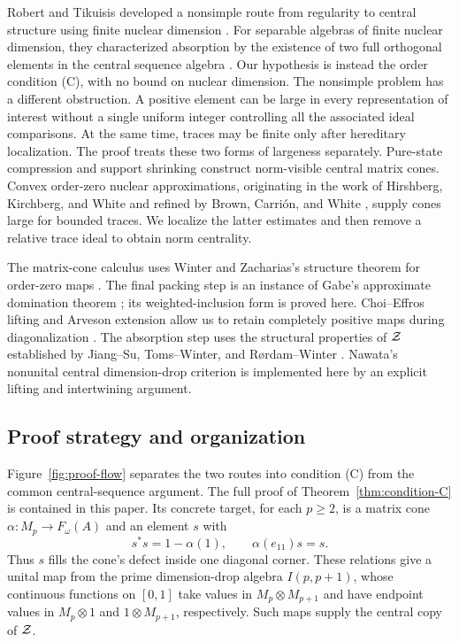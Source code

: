 Robert and Tikuisis developed a nonsimple route from regularity to
central structure using finite nuclear dimension
\cite[Theorem~1.1]{RobertTikuisis2017}. For separable algebras of
finite nuclear dimension, they characterized absorption by the
existence of two full orthogonal elements in the central sequence
algebra \cite[Theorem~1.2]{RobertTikuisis2017}.
Our hypothesis is instead the order condition \textup{(C)}, with no
bound on nuclear dimension.
The nonsimple problem has a different obstruction. A positive element
can be large in every representation of interest without a single
uniform integer controlling all the associated ideal comparisons.
At the same time, traces may be finite only after hereditary
localization. The proof treats these two forms of largeness
separately. Pure-state compression and support shrinking construct
norm-visible central matrix cones. Convex order-zero nuclear
approximations, originating in the work of Hirshberg, Kirchberg,
and White \cite{HKW2012} and refined by Brown, Carri\'on,
and White \cite{BCW2019}, supply cones large for bounded traces.
We localize the latter estimates and then remove a relative trace
ideal to obtain norm centrality.

The matrix-cone calculus uses Winter and Zacharias's structure
theorem for order-zero maps \cite{WZ2009}. The final packing step is
an instance of Gabe's approximate domination theorem
\cite{Gabe2020}; its weighted-inclusion form is proved here.
Choi--Effros lifting and Arveson extension allow us to retain
completely positive maps during diagonalization
\cite{CE1976,Arveson1969}. The absorption step uses the structural
properties of $\mathcal Z$ established by Jiang--Su, Toms--Winter, and
R\o rdam--Winter \cite{JS1999,TW2007,RW2010}. Nawata's nonunital
central dimension-drop criterion \cite[Proposition~5.1]{Nawata2013}
is implemented here by an explicit lifting and intertwining argument.

\subsection{Proof strategy and organization}

Figure~\ref{fig:proof-flow} separates the two routes into condition
\textup{(C)} from the common central-sequence argument. The full
proof of Theorem~\ref{thm:condition-C} is contained in this paper.
Its concrete target, for each $p\ge2$, is a matrix cone
$\alpha:M_p\to F_\omega(A)$ and an element $s$ with
\[
 s^*s=1-\alpha(1),\qquad \alpha(e_{11})s=s.
\]
Thus $s$ fills the cone's defect inside one diagonal corner.
These relations give a unital map from the prime dimension-drop
algebra $I(p,p+1)$, whose continuous functions on $[0,1]$ take values in
$M_p\otimes M_{p+1}$ and have endpoint values in
$M_p\otimes1$ and $1\otimes M_{p+1}$, respectively.
Such maps supply the central copy of $\mathcal Z$.

